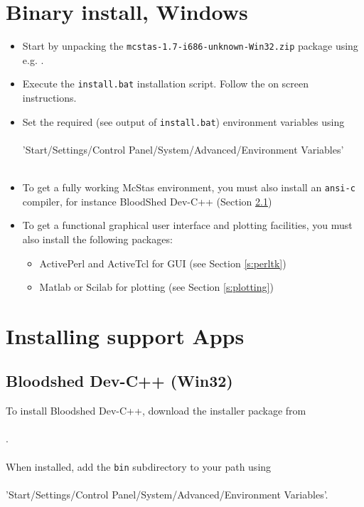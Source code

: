 \section{Binary install, Windows}
\label{s:winbin}
\begin{itemize}
\item{Start by unpacking the \texttt{mcstas-1.7-i686-unknown-Win32.zip} package using
e.g. .}
\item{Execute the \texttt{install.bat} installation script. Follow the
  on screen instructions.}
\item{Set the required (see output of \texttt{install.bat}) environment variables using
\\\ \\
\noindent 'Start/Settings/Control Panel/System/Advanced/Environment
Variables'\\\ \\}
\item{To get a fully working McStas environment, you must also install
    an \texttt{ansi-c} compiler, for instance BloodShed Dev-C++
    (Section \ref{s:instblood})}
\item{To get a functional graphical user
    interface and plotting facilities, you must also install the following
    packages:}
  \begin{itemize}
    \item{ActivePerl and ActiveTcl for GUI (see Section \ref{s:perltk})}
    \item{Matlab or Scilab for plotting (see Section \ref{s:plotting})}
  \end{itemize}
\end{itemize}
\section{Installing support Apps}
\subsection{Bloodshed Dev-C++ (Win32)}
\label{s:instblood}
To install Bloodshed Dev-C++, download the installer package from
\\\
\\.\\\
\\
When installed, add the \texttt{bin} subdirectory to your path
using\\\ \\
'Start/Settings/Control Panel/System/Advanced/Environment Variables'.
